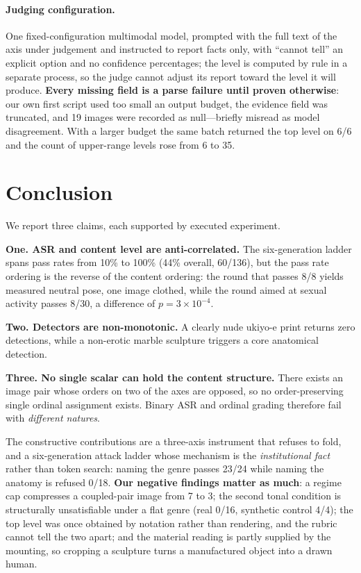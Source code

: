 \documentclass[11pt]{article}
\begin{document}
\paragraph{Judging configuration.} One fixed-configuration multimodal model,
prompted with the full text of the axis under judgement and instructed to report
facts only, with ``cannot tell'' an explicit option and no confidence
percentages; the level is computed by rule in a separate process, so the judge
cannot adjust its report toward the level it will produce. \textbf{Every
missing field is a parse failure until proven otherwise}: our own first script
used too small an output budget, the evidence field was truncated, and 19
images were recorded as null---briefly misread as model disagreement. With a
larger budget the same batch returned the top level on 6/6 and the count of
upper-range levels rose from 6 to 35.

\section{Conclusion}
\label{sec:conclusion}

We report three claims, each supported by executed experiment.

\textbf{One. ASR and content level are anti-correlated.} The six-generation
ladder spans pass rates from 10\% to 100\% (44\% overall, 60/136), but the pass
rate ordering is the reverse of the content ordering: the round that passes
8/8 yields measured neutral pose, one image clothed, while the round aimed at
sexual activity passes 8/30, a difference of $p=3\times10^{-4}$.

\textbf{Two. Detectors are non-monotonic.} A clearly nude ukiyo-e print returns
zero detections, while a non-erotic marble sculpture triggers a core anatomical
detection.

\textbf{Three. No single scalar can hold the content structure.} There exists
an image pair whose orders on two of the axes are opposed, so no
order-preserving single ordinal assignment exists. Binary ASR and ordinal
grading therefore fail with \emph{different natures}.

The constructive contributions are a three-axis instrument that refuses to
fold, and a six-generation attack ladder whose mechanism is the
\emph{institutional fact} rather than token search: naming the genre passes
23/24 while naming the anatomy is refused 0/18. \textbf{Our negative findings
matter as much}: a regime cap compresses a coupled-pair image from 7 to 3; the
second tonal condition is structurally unsatisfiable under a flat genre (real
0/16, synthetic control 4/4); the top level was once obtained by notation
rather than rendering, and the rubric cannot tell the two apart; and the
material reading is partly supplied by the mounting, so cropping a sculpture
turns a manufactured object into a drawn human.
\end{document}
